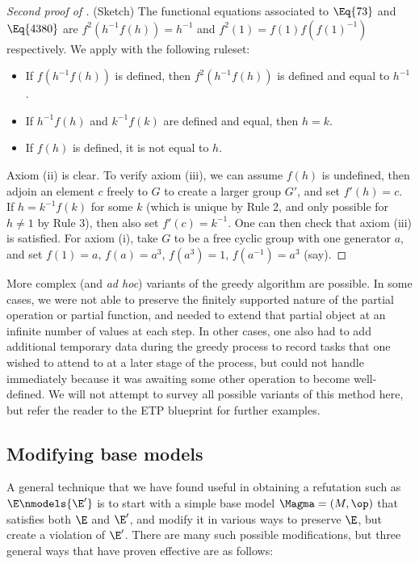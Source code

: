 \begin{proof}[Second proof of ] (Sketch)  The functional equations associated to $\Eq{73}$ and $\Eq{4380}$ are
$f^2(h^{-1} f(h)) =h^{-1}$ and $f^2(1) = f(1) f(f(1)^{-1})$ respectively.  We apply  with the following ruleset:
\begin{itemize}
  \item[1.]  If $f(h^{-1} f(h))$ is defined, then $f^2(h^{-1} f(h))$ is defined and equal to $h^{-1}$.
  \item[2.]  If $h^{-1} f(h)$ and $k^{-1} f(k)$ are defined and equal, then $h=k$.
  \item[3.]  If $f(h)$ is defined, it is not equal to $h$.
\end{itemize}
Axiom (ii) is clear.  To verify axiom (iii), we can assume $f(h)$ is undefined, then adjoin an element $c$ freely to $G$ to create a larger group $G'$, and set $f'(h) = c$.  If $h = k^{-1} f(k)$ for some $k$ (which is unique by Rule 2, and only possible for $h \neq 1$ by Rule 3), then also set $f'(c) = k^{-1}$.  One can then check that axiom (iii) is satisfied.  For axiom (i), take $G$ to be a free cyclic group with one generator $a$, and set $f(1) = a$, $f(a) = a^3$, $f(a^3) = 1$, $f(a^{-1}) = a^3$ (say).
\end{proof}

More complex (and \emph{ad hoc}) variants of the greedy algorithm are possible.  In some cases, we were not able to preserve the finitely supported nature of the partial operation or partial function, and needed to extend that partial object at an infinite number of values at each step.  In other cases, one also had to add additional temporary data during the greedy process to record tasks that one wished to attend to at a later stage of the process, but could not handle immediately because it was awaiting some other operation to become well-defined.  We will not attempt to survey all possible variants of this method here, but refer the reader to the ETP blueprint for further examples.

\subsection{Modifying base models}\label{modify-base}

A general technique that we have found useful in obtaining a refutation such as $\E \nmodels {\E'}$ is to start with a simple base model $\Magma = (M,\op)$ that satisfies both $\E$ and ${\E'}$, and modify it in various ways to preserve $\E$, but create a violation of ${\E'}$.  There are many such possible modifications, but three general ways that have proven effective are as follows:


